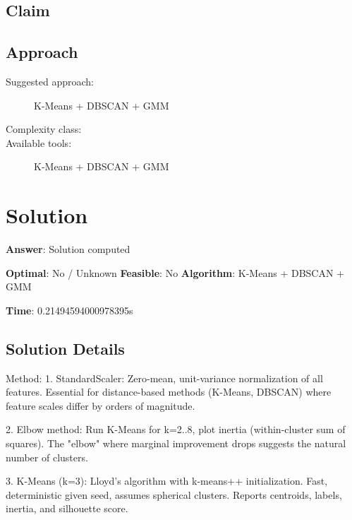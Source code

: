 \documentclass[11pt, a4paper]{article}
\begin{document}
\subsection{Claim}


\subsection{Approach}

\begin{description}
  \item[Suggested approach:] K-Means + DBSCAN + GMM
  \item[Complexity class:] 
  \item[Available tools:] K-Means + DBSCAN + GMM
\end{description}
\section{Solution}

\begin{polyaresult}

\textbf{Answer}: Solution computed


\textbf{Optimal}: No / Unknown \hfill
\textbf{Feasible}: No
\textbf{Algorithm}: K-Means + DBSCAN + GMM \quad $$

\textbf{Time}: 0.21494594000978395s


\end{polyaresult}

\subsection{Solution Details}


Method: 1. StandardScaler: Zero-mean, unit-variance normalization of all features. Essential for distance-based methods (K-Means, DBSCAN) where feature scales differ by orders of magnitude.

2. Elbow method: Run K-Means for k=2..8, plot inertia (within-cluster sum of squares). The "elbow" where marginal improvement drops suggests the natural number of clusters.

3. K-Means (k=3): Lloyd's algorithm with k-means++ initialization. Fast, deterministic given seed, assumes spherical clusters. Reports centroids, labels, inertia, and silhouette score.
\end{document}
